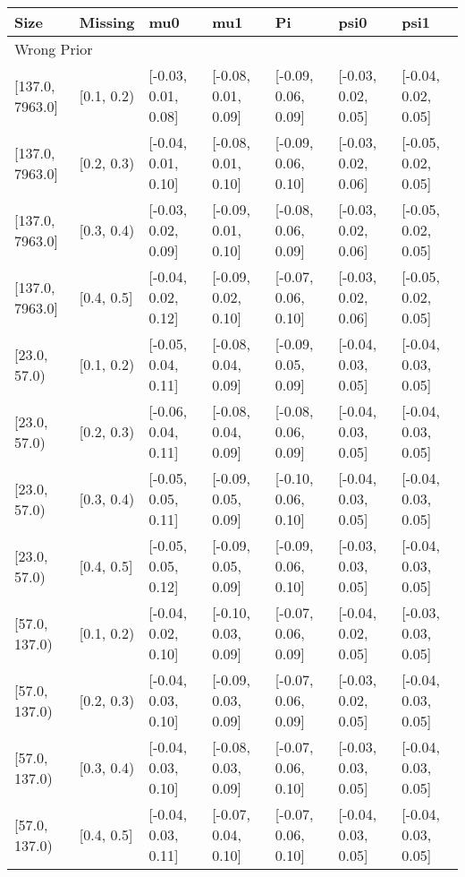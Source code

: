 \begin{table}[ht]
\centering
\begin{tabular}{lllllll}
  \toprule
Size & Missing & mu0 & mu1 & Pi & psi0 & psi1 \\ 
  \midrule
\multicolumn{7}{l}{Wrong Prior}\\
{[137.0, 7963.0]} & {[0.1, 0.2)} & {[-0.03, 0.01, 0.08]} & {[-0.08, 0.01, 0.09]} & {[-0.09, 0.06, 0.09]} & {[-0.03, 0.02, 0.05]} & {[-0.04, 0.02, 0.05]} \\ 
  {[137.0, 7963.0]} & {[0.2, 0.3)} & {[-0.04, 0.01, 0.10]} & {[-0.08, 0.01, 0.10]} & {[-0.09, 0.06, 0.10]} & {[-0.03, 0.02, 0.06]} & {[-0.05, 0.02, 0.05]} \\ 
  {[137.0, 7963.0]} & {[0.3, 0.4)} & {[-0.03, 0.02, 0.09]} & {[-0.09, 0.01, 0.10]} & {[-0.08, 0.06, 0.09]} & {[-0.03, 0.02, 0.06]} & {[-0.05, 0.02, 0.05]} \\ 
  {[137.0, 7963.0]} & {[0.4, 0.5]} & {[-0.04, 0.02, 0.12]} & {[-0.09, 0.02, 0.10]} & {[-0.07, 0.06, 0.10]} & {[-0.03, 0.02, 0.06]} & {[-0.05, 0.02, 0.05]} \\ 
  {[23.0, 57.0)} & {[0.1, 0.2)} & {[-0.05, 0.04, 0.11]} & {[-0.08, 0.04, 0.09]} & {[-0.09, 0.05, 0.09]} & {[-0.04, 0.03, 0.05]} & {[-0.04, 0.03, 0.05]} \\ 
  {[23.0, 57.0)} & {[0.2, 0.3)} & {[-0.06, 0.04, 0.11]} & {[-0.08, 0.04, 0.09]} & {[-0.08, 0.06, 0.09]} & {[-0.04, 0.03, 0.05]} & {[-0.04, 0.03, 0.05]} \\ 
  {[23.0, 57.0)} & {[0.3, 0.4)} & {[-0.05, 0.05, 0.11]} & {[-0.09, 0.05, 0.09]} & {[-0.10, 0.06, 0.10]} & {[-0.04, 0.03, 0.05]} & {[-0.04, 0.03, 0.05]} \\ 
  {[23.0, 57.0)} & {[0.4, 0.5]} & {[-0.05, 0.05, 0.12]} & {[-0.09, 0.05, 0.09]} & {[-0.09, 0.06, 0.10]} & {[-0.03, 0.03, 0.05]} & {[-0.04, 0.03, 0.05]} \\ 
  {[57.0, 137.0)} & {[0.1, 0.2)} & {[-0.04, 0.02, 0.10]} & {[-0.10, 0.03, 0.09]} & {[-0.07, 0.06, 0.09]} & {[-0.04, 0.02, 0.05]} & {[-0.03, 0.03, 0.05]} \\ 
  {[57.0, 137.0)} & {[0.2, 0.3)} & {[-0.04, 0.03, 0.10]} & {[-0.09, 0.03, 0.09]} & {[-0.07, 0.06, 0.09]} & {[-0.03, 0.02, 0.05]} & {[-0.04, 0.03, 0.05]} \\ 
  {[57.0, 137.0)} & {[0.3, 0.4)} & {[-0.04, 0.03, 0.10]} & {[-0.08, 0.03, 0.09]} & {[-0.07, 0.06, 0.10]} & {[-0.03, 0.03, 0.05]} & {[-0.04, 0.03, 0.05]} \\ 
  {[57.0, 137.0)} & {[0.4, 0.5]} & {[-0.04, 0.03, 0.11]} & {[-0.07, 0.04, 0.10]} & {[-0.07, 0.06, 0.10]} & {[-0.04, 0.03, 0.05]} & {[-0.04, 0.03, 0.05]} \\ 

\end{tabular}
\end{table}
